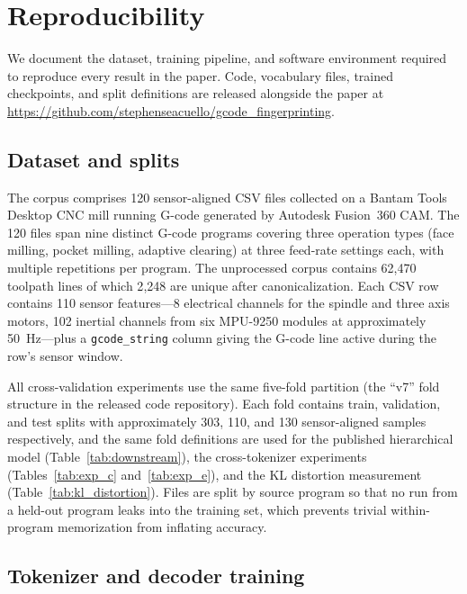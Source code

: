 \documentclass[11pt]{article}
\begin{document}
\section{Reproducibility}
\label{sec:reproducibility}

We document the dataset, training pipeline, and software environment required to reproduce every result in the paper. Code, vocabulary files, trained checkpoints, and split definitions are released alongside the paper at \url{https://github.com/stephenseacuello/gcode\_fingerprinting}.

\subsection{Dataset and splits}
\label{sec:repro_data}

The corpus comprises 120 sensor-aligned CSV files collected on a Bantam Tools Desktop CNC mill running G-code generated by Autodesk Fusion~360 CAM. The 120 files span nine distinct G-code programs covering three operation types (face milling, pocket milling, adaptive clearing) at three feed-rate settings each, with multiple repetitions per program. The unprocessed corpus contains 62{,}470 toolpath lines of which 2{,}248 are unique after canonicalization. Each CSV row contains 110 sensor features---8 electrical channels for the spindle and three axis motors, 102 inertial channels from six MPU-9250 modules at approximately 50~Hz---plus a \texttt{gcode\_string} column giving the G-code line active during the row's sensor window.

All cross-validation experiments use the same five-fold partition (the ``v7'' fold structure in the released code repository). Each fold contains train, validation, and test splits with approximately 303, 110, and 130 sensor-aligned samples respectively, and the same fold definitions are used for the published hierarchical model (Table~\ref{tab:downstream}), the cross-tokenizer experiments (Tables~\ref{tab:exp_c} and~\ref{tab:exp_e}), and the KL distortion measurement (Table~\ref{tab:kl_distortion}). Files are split by source program so that no run from a held-out program leaks into the training set, which prevents trivial within-program memorization from inflating accuracy.

\subsection{Tokenizer and decoder training}
\label{sec:repro_training}
\end{document}
